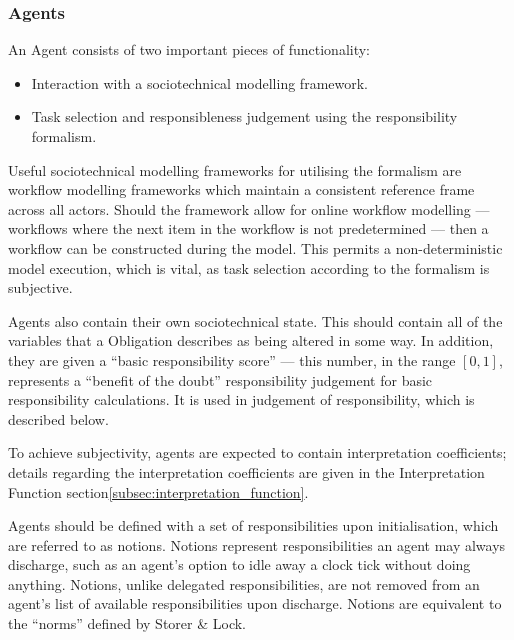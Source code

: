 \subsubsection{Agents}  %
An Agent consists of two important pieces of functionality:

\begin{itemize}
    \item Interaction with a sociotechnical modelling framework.
    \item Task selection and responsibleness judgement using the responsibility formalism.
\end{itemize}

Useful sociotechnical modelling frameworks for utilising the formalism are workflow modelling frameworks which maintain a consistent reference frame across all actors. Should the framework allow for online workflow modelling --- workflows where the next item in the workflow is not predetermined --- then a workflow can be constructed during the model. This permits a non-deterministic model execution, which is vital, as task selection according to the formalism is subjective.\par

Agents also contain their own sociotechnical state. This should contain all of the variables that a Obligation describes as being altered in some way. In addition, they are given a ``basic responsibility score'' --- this number, in the range \([0,1]\), represents a ``benefit of the doubt'' responsibility judgement for basic responsibility calculations. It is used in judgement of responsibility, which is described below.\par

To achieve subjectivity, agents are expected to contain interpretation coefficients; details regarding the interpretation coefficients are given in the Interpretation Function section\cref{subsec:interpretation_function}.\par

Agents should be defined with a set of responsibilities upon initialisation, which are referred to as notions. Notions represent responsibilities an agent may always discharge, such as an agent's option to idle away a clock tick without doing anything. Notions, unlike delegated responsibilities, are not removed from an agent's list of available responsibilities upon discharge. Notions are equivalent to the ``norms'' defined by Storer \& Lock\cite{storer2008modelling}.\par

